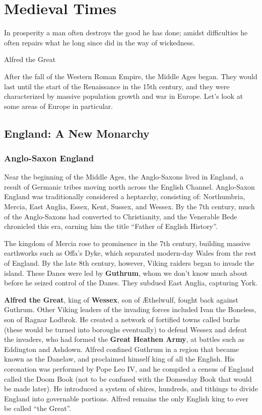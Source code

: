 \chapter{Medieval Times}

\epigraph{%
  In prosperity a man often destroys the good he has done;
  amidst difficulties he often repairs what he long since did in the way of wickedness.
}{Alfred the Great}

After the fall of the Western Roman Empire, the Middle Ages began.
They would last until the start of the Renaissance in the 15th century,
and they were characterized by massive population growth and war in Europe.
Let's look at some areas of Europe in particular.

\section{England: A New Monarchy}

\subsection*{Anglo-Saxon England}

Near the beginning of the Middle Ages, the Anglo-Saxons lived in England,
a result of Germanic tribes moving north across the English Channel.
Anglo-Saxon England was traditionally considered a heptarchy, consisting of:
Northumbria, Mercia, East Anglia, Essex, Kent, Sussex, and Wessex.
By the 7th century, much of the Anglo-Saxons had converted to Christianity,
and the Venerable Bede chronicled this era, earning him the title ``Father of English History''.

The kingdom of Mercia rose to prominence in the 7th century, building massive earthworks such as
Offa's Dyke, which separated modern-day Wales from the rest of England.
By the late 8th century, however, Viking raiders began to invade the island.
These Danes were led by \textbf{Guthrum}, whom we don't know much about before he seized control of the Danes.
They subdued East Anglia, capturing York.

\textbf{Alfred the Great}, king of \textbf{Wessex}, son of \AE{}thelwulf, fought back against Guthrum.
Other Viking leaders of the invading forces included Ivan the Boneless, son of Ragnar Lodbrok.
He created a network of fortified towns called burhs (these would be turned into boroughs eventually)
to defend Wessex and defeat the invaders, who had formed the \textbf{Great Heathen Army},
at battles such as Eddington and Ashdown.
Alfred confined Guthrum in a region that became known as the Danelaw, and proclaimed himself king of all the English.
His coronation was performed by Pope Leo IV,
and he compiled a census of England called the Doom Book
(not to be confused with the Domesday Book that would be made later).
He introduced a system of shires, hundreds, and tithings to divide England into governable portions.
Alfred remains the only English king to ever be called ``the Great''.

